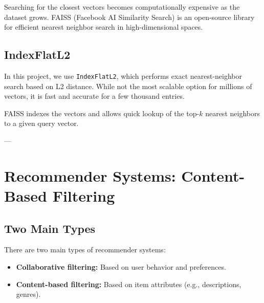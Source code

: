 Searching for the closest vectors becomes computationally expensive as the dataset grows. FAISS (Facebook AI Similarity Search) is an open-source library for efficient nearest neighbor search in high-dimensional spaces.

\subsection*{IndexFlatL2}

In this project, we use \texttt{IndexFlatL2}, which performs exact nearest-neighbor search based on L2 distance. While not the most scalable option for millions of vectors, it is fast and accurate for a few thousand entries.

FAISS indexes the vectors and allows quick lookup of the top-$k$ nearest neighbors to a given query vector.

---

\section{Recommender Systems: Content-Based Filtering}
\label{sec:theory-recommenders}

\subsection*{Two Main Types}

There are two main types of recommender systems:
\begin{itemize}
    \item \textbf{Collaborative filtering:} Based on user behavior and preferences.
    \item \textbf{Content-based filtering:} Based on item attributes (e.g., descriptions, genres).
\end{itemize}

